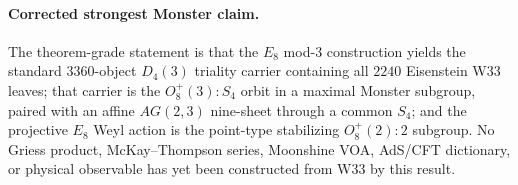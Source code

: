 \paragraph{Corrected strongest Monster claim.}
The theorem-grade statement is that the $E_8$ mod-$3$ construction yields the
standard $3360$-object $D_4(3)$ triality carrier containing all $2240$ Eisenstein
W33 leaves; that carrier is the $O_8^+(3):S_4$ orbit in a maximal Monster
subgroup, paired with an affine $AG(2,3)$ nine-sheet through a common $S_4$; and
the projective $E_8$ Weyl action is the point-type stabilizing
$O_8^+(2):2$ subgroup.  No Griess product, McKay--Thompson series, Moonshine VOA,
AdS/CFT dictionary, or physical observable has yet been constructed from W33 by
this result.
